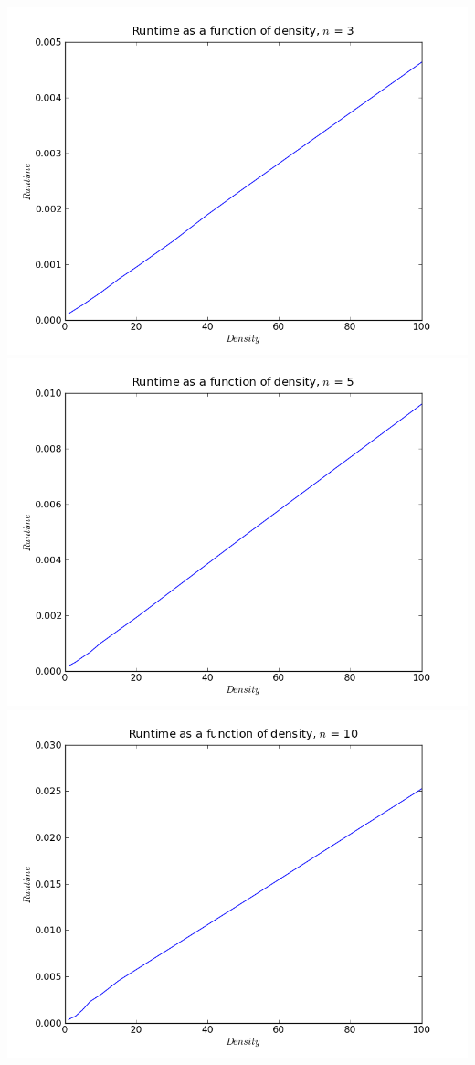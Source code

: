 \documentclass{article}
\begin{document}
\includegraphics[scale=0.5]{timen3.png}
\includegraphics[scale=0.5]{timen5.png}
\includegraphics[scale=0.5]{timen10.png}
\end{document}
